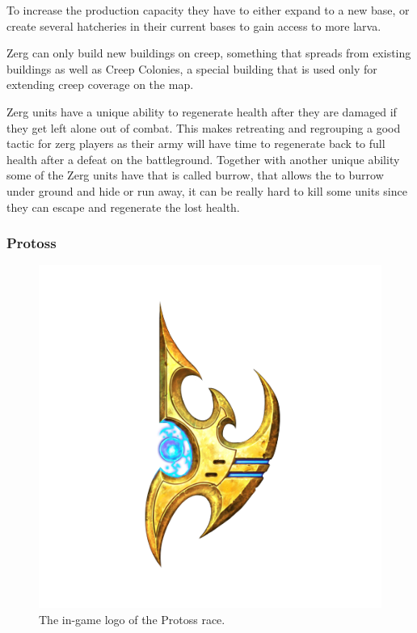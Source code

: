 To increase the production capacity they have to either expand to a new base, or create several hatcheries in their current bases to gain access to more larva.

Zerg can only build new buildings on creep, something that spreads from existing buildings as well as Creep Colonies, a special building that is used only for extending creep coverage on the map.

Zerg units have a unique ability to regenerate health after they are damaged if they get left alone out of combat. This makes retreating and regrouping a good tactic for zerg players as their army will have time to regenerate back to full health after a defeat on the battleground. Together with another unique ability some of the Zerg units have that is called burrow, that allows the to burrow under ground and hide or run away, it can be really hard to kill some units since they can escape and regenerate the lost health. 

\subsubsection{Protoss}
\begin{figure}[h!tb]
\centering
\includegraphics[scale=0.3]{graphics/protossicon.png}
\caption{The in-game logo of the Protoss race.\cite{protosslogo}}
\end{figure}

